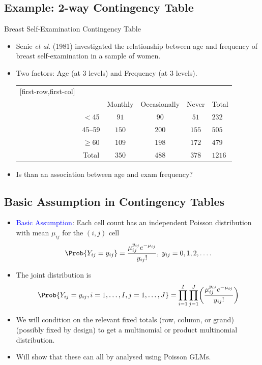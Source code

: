 \documentclass{article}\usepackage[]{graphicx}\usepackage[svgnames]{xcolor}
\begin{document}
\subsection*{Example: 2-way Contingency Table}
\begin{Example}{Breast Self-Examination Contingency Table}
      \begin{itemize}
            \item Senie \emph{et al}. (1981) investigated the relationship between age and frequency of
                  breast self-examination in a sample of women.
            \item Two factors: Age (at 3 levels) and Frequency (at 3 levels).
                  \begin{center}
                        \begin{NiceTabular}{c|ccc|c}[first-row,first-col]
                              &&\\
                              && Monthly & Occasionally & Never & Total\\
                              \midrule
                               & $<$45 & $ 91 $ & $ 90 $ & $ 51 $ & $ 232 $\\
                              & 45--59 & $ 150 $ & $ 200 $ & $ 155 $ & $ 505 $\\
                              & $ \ge $60 & $ 109 $ & $ 198 $ & $ 172 $ & $ 479 $\\
                              \midrule
                              & Total & $ 350 $ & $ 488 $ & $ 378 $ & $ 1216 $
                        \end{NiceTabular}
                  \end{center}
            \item Is than an association between age and exam frequency?
      \end{itemize}
\end{Example}
\subsection*{Basic Assumption in Contingency Tables}
\begin{itemize}
      \item \textcolor{Blue}{Basic Assumption}: Each cell count has an independent Poisson distribution with
            mean $ \mu_{ij} $ for the $ (i,j) $ cell
            \[ \Prob{Y_{ij}=y_{ij}}=\frac{\mu_{ij}^{y_{ij}}e^{-\mu_{ij}}}{y_{ij}!},\;y_{ij}=0,1,2,\ldots. \]
      \item The joint distribution is
            \[ \Prob{Y_{i j}=y_{i j}, i=1, \ldots, I, j=1, \ldots, J}=
                  \prod_{i=1}^{I} \prod_{j=1}^{J}\biggl(\frac{\mu_{i j}^{y_{i j}} e^{-\mu_{i j}}}{y_{i j} !}\biggr) \]
      \item We will condition on the relevant fixed totals (row, column, or grand) (possibly
            fixed by design) to get a multinomial or product multinomial distribution.
      \item Will show that these can all by analysed using Poisson GLMs.
\end{itemize}
\end{document}
